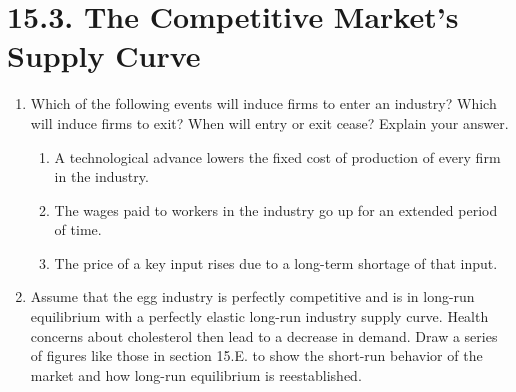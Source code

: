 \documentclass{article}
\begin{document}
\section*{15.3. The Competitive Market's Supply Curve}

\begin{enumerate}

\item Which of the following events will induce firms to enter an industry? Which will induce firms to exit? When will entry or exit cease? Explain your answer.

	\begin{enumerate}
	
	\item A technological advance lowers the fixed cost of production of every firm in the industry.
	
	\item The wages paid to workers in the industry go up for an extended period of time.
	
	\item The price of a key input rises due to a long-term shortage of that input.
	
	\end{enumerate}
	
\item Assume that the egg industry is perfectly competitive and is in long-run equilibrium with a perfectly elastic long-run industry supply curve. Health concerns about cholesterol then lead to a decrease in demand. Draw a series of figures like those in section 15.E. to show the short-run behavior of the market and how long-run equilibrium is reestablished. 

\end{enumerate}
\end{document}
